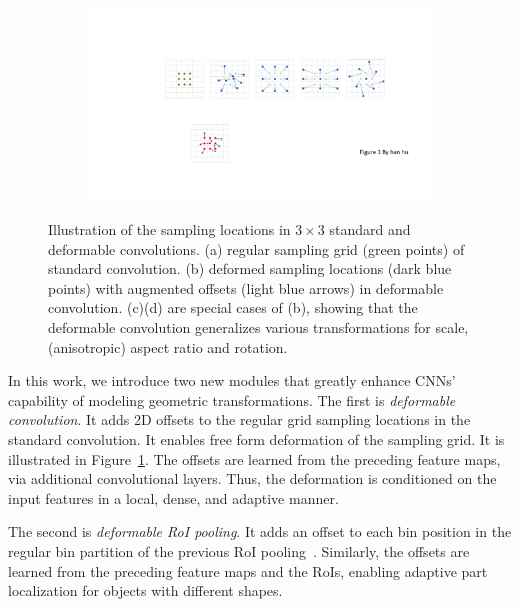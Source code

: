 \documentclass[10pt,twocolumn,letterpaper]{article}
\begin{document}
\begin{figure}[t]
\begin{subfigure}{0.24\linewidth}
        \caption{}
    \end{subfigure}
    \begin{subfigure}{0.24\linewidth}
        \includegraphics[width=\linewidth]{DC_concept_v4e.pdf}
        \caption{}
    \end{subfigure}
    \vspace{-0.5em}
\caption{Illustration of the sampling locations in $3\times 3$ standard and deformable convolutions. (a) regular sampling grid (green points) of standard convolution. (b) deformed sampling locations (dark blue points) with augmented offsets (light blue arrows) in deformable convolution. (c)(d) are special cases of (b), showing that the deformable convolution generalizes various transformations for scale, (anisotropic) aspect ratio and rotation.}
\label{fig.DC_concept}
\end{figure}

In this work, we introduce two new modules that greatly enhance CNNs' capability of modeling geometric transformations. The first is \emph{deformable convolution}. It adds 2D offsets to the regular grid sampling locations in the standard convolution. It enables free form deformation of the sampling grid. It is illustrated in Figure~\ref{fig.DC_concept}. The offsets are learned from the preceding feature maps, via additional convolutional layers. Thus, the deformation is conditioned on the input features in a local, dense, and adaptive manner.

The second is \emph{deformable RoI pooling}. It adds an offset to each bin position in the regular bin partition of the previous RoI pooling~\cite{girshick2015fast,dai2016rfcn}. Similarly, the offsets are learned from the preceding feature maps and the RoIs, enabling adaptive part localization for objects with different shapes.
\end{document}
